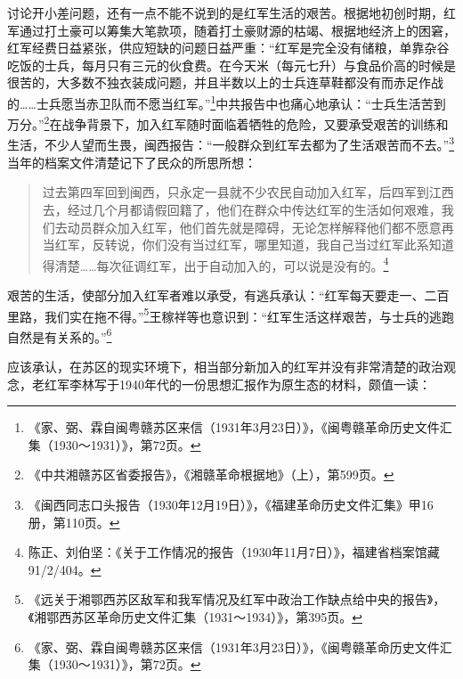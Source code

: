 讨论开小差问题，还有一点不能不说到的是红军生活的艰苦。根据地初创时期，红军通过打土豪可以筹集大笔款项，随着打土豪财源的枯竭、根据地经济上的困窘，红军经费日益紧张，供应短缺的问题日益严重：“红军是完全没有储粮，单靠杂谷吃饭的士兵，每月只有三元的伙食费。在今天米（每元七升）与食品价高的时候是很苦的，大多数不独衣装成问题，并且半数以上的士兵连草鞋都没有而赤足作战的……士兵愿当赤卫队而不愿当红军。”\footnote{《家、弼、霖自闽粤赣苏区来信（1931年3月23日）》，《闽粤赣革命历史文件汇集（1930～1931）》，第72页。}中共报告中也痛心地承认：“士兵生活苦到万分。”\footnote{《中共湘赣苏区省委报告》，《湘赣革命根据地》（上），第599页。}在战争背景下，加入红军随时面临着牺牲的危险，又要承受艰苦的训练和生活，不少人望而生畏，闽西报告：“一般群众到红军去都为了生活艰苦而不去。”\footnote{《闽西同志口头报告（1930年12月19日）》，《福建革命历史文件汇集》甲16册，第110页。}当年的档案文件清楚记下了民众的所思所想：

\begin{quote}

过去第四军回到闽西，只永定一县就不少农民自动加入红军，后四军到江西去，经过几个月都请假回籍了，他们在群众中传达红军的生活如何艰难，我们去动员群众加入红军，他们首先就是障碍，无论怎样解释他们都不愿意再当红军，反转说，你们没有当过红军，哪里知道，我自己当过红军此系知道得清楚……每次征调红军，出于自动加入的，可以说是没有的。\footnote{陈正、刘伯坚：《关于工作情况的报告（1930年11月7日）》，福建省档案馆藏91/2/404。}
\end{quote}


艰苦的生活，使部分加入红军者难以承受，有逃兵承认：“红军每天要走一、二百里路，我们实在拖不得。”\footnote{《远关于湘鄂西苏区敌军和我军情况及红军中政治工作缺点给中央的报告》，《湘鄂西苏区革命历史文件汇集（1931～1934）》，第395页。}王稼祥等也意识到：“红军生活这样艰苦，与士兵的逃跑自然是有关系的。”\footnote{《家、弼、霖自闽粤赣苏区来信（1931年3月23日）》，《闽粤赣革命历史文件汇集（1930～1931）》，第72页。}


应该承认，在苏区的现实环境下，相当部分新加入的红军并没有非常清楚的政治观念，老红军李林写于1940年代的一份思想汇报作为原生态的材料，颇值一读：

